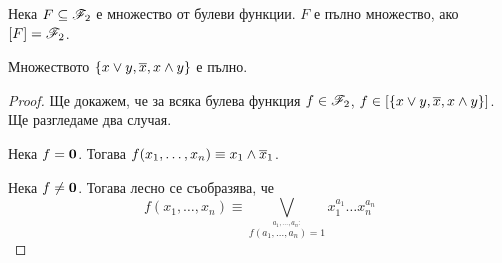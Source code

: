 

\begin{dfn}
  Нека $F\subseteq \mathscr{F}_2$ е множество от булеви функции. 
  $F$ е пълно множество, ако $[F] = \mathscr{F}_2$.
\end{dfn}

\begin{thm}[Бул]
  Множеството $\{x\vee y,\overline{x},x\wedge y\}$ е пълно.
\end{thm}
\begin{proof}
  Ще докажем, че за всяка булева функция $f \in \mathscr{F}_2$, $f \in [\{x\vee y, \overline{x}, x \wedge y\}]$.
  Ще разгледаме два случая.
  
  Нека $f = \bf{0}$. Тогава $f(x_1,\dots,x_n) \equiv x_1\wedge\overline{x}_1$.
  
  Нека $f \neq \bf{0}$. Тогава лесно се съобразява, че
  \[f(x_1,\dots,x_n) \equiv \bigvee_{\stackrel{a_1,\dots,a_n:}{f(a_1,\dots,a_n) = 1}} x^{a_1}_1\dots x^{a_n}_n\]
\end{proof}



